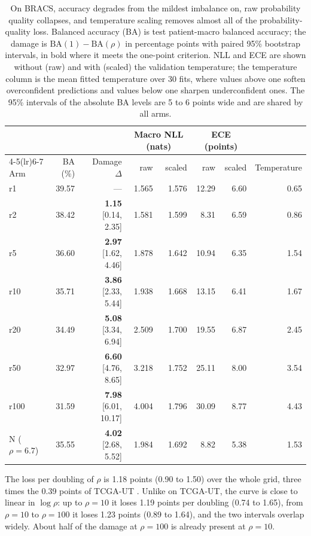 \begin{table}[htbp]
\centering
\small
\setlength{\tabcolsep}{4pt}
\renewcommand{\arraystretch}{1.15}
\begin{tabular}{@{}lrrrrrrr@{}}
\toprule
 & & & \multicolumn{2}{c}{Macro NLL (nats)} & \multicolumn{2}{c}{ECE (points)} & \\
\cmidrule(lr){4-5}\cmidrule(lr){6-7}
Arm & BA (\%) & Damage $\Delta$ & raw & scaled & raw & scaled & Temperature \\
\midrule
r1 & 39.57 & --- & 1.565 & 1.576 & 12.29 & 6.60 & 0.65 \\
r2 & 38.42 & \textbf{1.15} [0.14, 2.35] & 1.581 & 1.599 & 8.31 & 6.59 & 0.86 \\
r5 & 36.60 & \textbf{2.97} [1.62, 4.46] & 1.878 & 1.642 & 10.94 & 6.35 & 1.54 \\
r10 & 35.71 & \textbf{3.86} [2.33, 5.44] & 1.938 & 1.668 & 13.15 & 6.41 & 1.67 \\
r20 & 34.49 & \textbf{5.08} [3.34, 6.94] & 2.509 & 1.700 & 19.55 & 6.87 & 2.45 \\
r50 & 32.97 & \textbf{6.60} [4.76, 8.65] & 3.218 & 1.752 & 25.11 & 8.00 & 3.54 \\
r100 & 31.59 & \textbf{7.98} [6.01, 10.17] & 4.004 & 1.796 & 30.09 & 8.77 & 4.43 \\
\addlinespace
N ($\rho=6.7$) & 35.55 & \textbf{4.02} [2.68, 5.52] & 1.984 & 1.692 & 8.82 & 5.38 & 1.53 \\
\bottomrule
\end{tabular}
\caption{On BRACS, accuracy degrades from the mildest imbalance on, raw probability quality collapses, and temperature scaling removes almost all of the probability-quality loss. Balanced accuracy (BA) is test patient-macro balanced accuracy; the damage is $\mathrm{BA}(1)-\mathrm{BA}(\rho)$ in percentage points with paired 95\% bootstrap intervals, in bold where it meets the one-point criterion. NLL and ECE are shown without (raw) and with (scaled) the validation temperature; the temperature column is the mean fitted temperature over 30 fits, where values above one soften overconfident predictions and values below one sharpen underconfident ones. The 95\% intervals of the absolute BA levels are 5 to 6 points wide and are shared by all arms.}
\label{tab:curve}
\end{table}

\noindent The loss per doubling of $\rho$ is 1.18 points (0.90 to 1.50) over the whole grid, three times the 0.39 points of TCGA-UT \citep{queisler2026prevalenceTcga}. Unlike on TCGA-UT, the curve is close to linear in $\log\rho$: up to $\rho=10$ it loses 1.19 points per doubling (0.74 to 1.65), from $\rho=10$ to $\rho=100$ it loses 1.23 points (0.89 to 1.64), and the two intervals overlap widely. About half of the damage at $\rho=100$ is already present at $\rho=10$.

